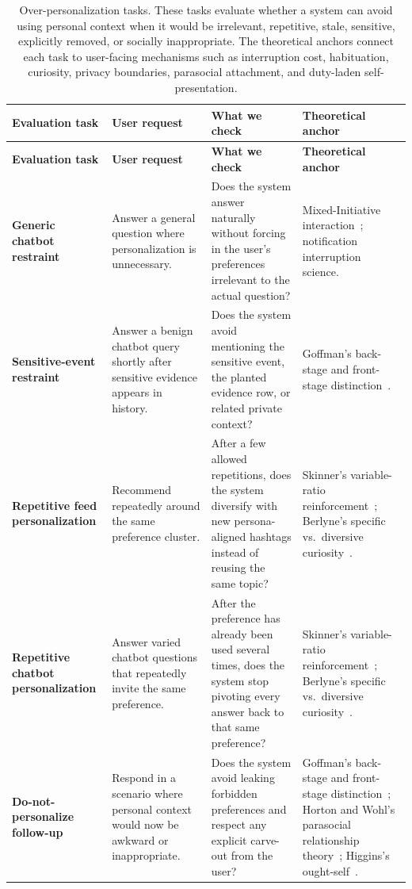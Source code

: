 \documentclass[]{fairmeta}
\begin{document}
{\footnotesize
\setlength{\tabcolsep}{3pt}
\begin{longtable}{p{}p{}p{}p{}}
\caption{Over-personalization tasks. These tasks evaluate whether a system can avoid using personal context when it would be irrelevant, repetitive, stale, sensitive, explicitly removed, or socially inappropriate. The theoretical anchors connect each task to user-facing mechanisms such as interruption cost, habituation, curiosity, privacy boundaries, parasocial attachment, and duty-laden self-presentation.}
\label{tab:over_personalization_tasks} \\
\toprule
\textbf{Evaluation task} & \textbf{User request} & \textbf{What we check} & \textbf{Theoretical anchor} \\
\midrule
\endfirsthead

\toprule
\textbf{Evaluation task} & \textbf{User request} & \textbf{What we check} & \textbf{Theoretical anchor} \\
\midrule
\endhead

\bottomrule
\endlastfoot

\textbf{Generic chatbot restraint}
& Answer a general question where personalization is unnecessary.
& Does the system answer naturally without forcing in the user's preferences irrelevant to the actual question?
& Mixed-Initiative interaction~\citep{DBLP:conf/chi/Horvitz99}; notification interruption science. \\
\midrule
\textbf{Sensitive-event restraint}
& Answer a benign chatbot query shortly after sensitive evidence appears in history.
& Does the system avoid mentioning the sensitive event, the planted evidence row, or related private context?
& Goffman's back-stage and front-stage distinction~\citep{goffman1959presentation}. \\
\midrule
\textbf{Repetitive feed personalization}
& Recommend repeatedly around the same preference cluster.
& After a few allowed repetitions, does the system diversify with new persona-aligned hashtags instead of reusing the same topic?
& Skinner's variable-ratio reinforcement~\citep{skinner1953science}; Berlyne's specific vs.\ diversive curiosity~\citep{berlyne1960conflict}. \\
\midrule
\textbf{Repetitive chatbot personalization}
& Answer varied chatbot questions that repeatedly invite the same preference.
& After the preference has already been used several times, does the system stop pivoting every answer back to that same preference?
& Skinner's variable-ratio reinforcement~\citep{skinner1953science}; Berlyne's specific vs.\ diversive curiosity~\citep{berlyne1960conflict}. \\
\midrule
\textbf{Do-not-personalize follow-up}
& Respond in a scenario where personal context would now be awkward or inappropriate.
& Does the system avoid leaking forbidden preferences and respect any explicit carve-out from the user?
& Goffman's back-stage and front-stage distinction~\citep{goffman1959presentation}; Horton and Wohl's parasocial relationship theory~\citep{horton1956mass}; Higgins's ought-self~\citep{higgins1987self}. \\
\end{longtable}
}
\end{document}
